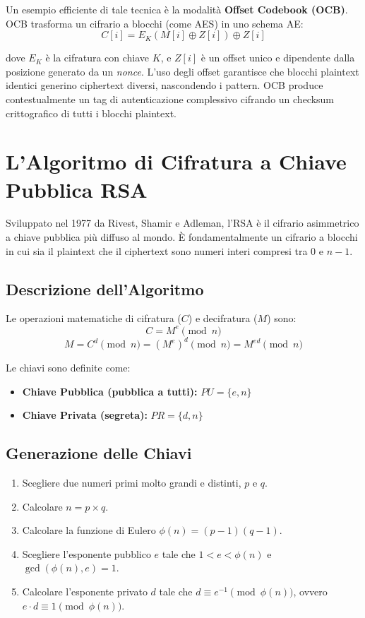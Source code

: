 Un esempio efficiente di tale tecnica è la modalità \textbf{Offset Codebook (OCB)}. OCB trasforma un cifrario a blocchi (come AES) in uno schema AE:
$$C[i] = E_K(M[i] \oplus Z[i]) \oplus Z[i]$$

dove $E_K$ è la cifratura con chiave $K$, e $Z[i]$ è un offset unico e dipendente dalla posizione generato da un \textit{nonce}. L'uso degli offset garantisce che blocchi plaintext identici generino ciphertext diversi, nascondendo i pattern. OCB produce contestualmente un tag di autenticazione complessivo cifrando un checksum crittografico di tutti i blocchi plaintext.

\section{L'Algoritmo di Cifratura a Chiave Pubblica RSA}

Sviluppato nel 1977 da Rivest, Shamir e Adleman, l'RSA è il cifrario asimmetrico a chiave pubblica più diffuso al mondo. È fondamentalmente un cifrario a blocchi in cui sia il plaintext che il ciphertext sono numeri interi compresi tra $0$ e $n-1$.

\subsection{Descrizione dell'Algoritmo}
Le operazioni matematiche di cifratura ($C$) e decifratura ($M$) sono:
$$C = M^e \pmod{n}$$
$$M = C^d \pmod{n} = (M^e)^d \pmod{n} = M^{ed} \pmod{n}$$

Le chiavi sono definite come:
\begin{itemize}
    \item \textbf{Chiave Pubblica (pubblica a tutti):} $PU = \{e, n\}$
    \item \textbf{Chiave Privata (segreta):} $PR = \{d, n\}$
\end{itemize}

\subsection{Generazione delle Chiavi}
\begin{enumerate}
    \item Scegliere due numeri primi molto grandi e distinti, $p$ e $q$.
    \item Calcolare $n = p \times q$.
    \item Calcolare la funzione di Eulero $\phi(n) = (p-1)(q-1)$.
    \item Scegliere l'esponente pubblico $e$ tale che $1 < e < \phi(n)$ e $\gcd(\phi(n), e) = 1$.
    \item Calcolare l'esponente privato $d$ tale che $d \equiv e^{-1} \pmod{\phi(n)}$, ovvero $e \cdot d \equiv 1 \pmod{\phi(n)}$.
\end{enumerate}

